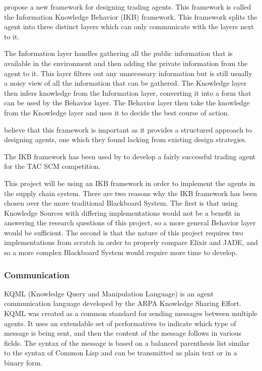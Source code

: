  propose a new framework for designing trading agents.
This framework is called the Information Knowledge Behavior (IKB) framework.
This framework splits the agent into three distinct layers which can only communicate with the layers next to it.

The Information layer handles gathering all the public information that is available in the environment and then adding the private information from the agent to it.
This layer filters out any unnecessary information but is still usually a noisy view of all the information that can be gathered.
The Knowledge layer then infers knowledge from the Information layer, converting it into a form that can be used by the Behavior layer.
The Behavior layer then take the knowledge from the Knowledge layer and uses it to decide the best course of action.

 believe that this framework is important as it provides a structured approach to designing agents, one which they found lacking from existing design strategies.

The IKB framework has been used by  to develop a fairly successful trading agent for the TAC SCM competition.

This project will be using an IKB framework in order to implement the agents in the supply chain system.
There are two reasons why the IKB framework has been chosen over the more traditional Blackboard System.
The first is that using Knowledge Sources with differing implementations would not be a benefit in answering the research questions of this project, so a more general Behavior layer would be sufficient.
The second is that the nature of this project requires two implementations from scratch in order to properly compare Elixir and JADE, and so a more complex Blackboard System would require more time to develop.

\subsubsection{Communication}

KQML (Knowledge Query and Manipulation Language) is an agent communication language developed by the ARPA Knowledge Sharing Effort.
KQML was created as a common standard for sending messages between multiple agents.
It uses an extendable set of performatives to indicate which type of message is being sent, and then the content of the message follows in various fields.
The syntax of the message is based on a balanced parenthesis list similar to the syntax of Common Lisp and can be transmitted as plain text or in a binary form.~\cite{finin1994kqml}

